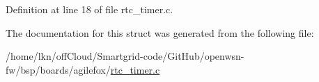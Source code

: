 Definition at line 18 of file rtc\+\_\+timer.\+c.



The documentation for this struct was generated from the following file\+:\begin{DoxyCompactItemize}
\item 
/home/lkn/off\+Cloud/\+Smartgrid-\/code/\+Git\+Hub/openwsn-\/fw/bsp/boards/agilefox/\hyperlink{agilefox_2rtc__timer_8c}{rtc\+\_\+timer.\+c}\end{DoxyCompactItemize}
